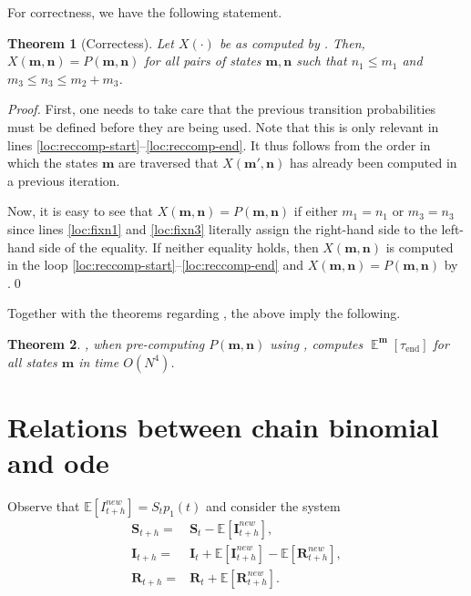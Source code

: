 \documentclass[a4paper,preprint]{elsarticle}
\newtheorem{theorem}{Theorem}
\newcommand{\htime}{\tau_\mathrm{end}}
\renewcommand{\vec}[1]{\boldsymbol{#1}}
\DeclareMathOperator{\Ex}{\mathbb{E}}
\begin{document}
For correctness, we have the following statement.
\begin{theorem}[Correctess]
    Let $X(\cdot)$ be as computed by . Then, $X(\vec{m}, \vec{n}) = P(\vec{m},\vec{n})$ for all pairs of states $\vec{m}, \vec{n}$ such that $n_1 \leq m_1$ and $m_3 \leq n_3 \leq m_2 + m_3$.
\end{theorem}
\begin{proof}
    First, one needs to take care that the previous transition probabilities must be defined before they are being used. Note that this is only relevant in lines \ref{loc:reccomp-start}--\ref{loc:reccomp-end}. It thus follows from the order in which the states $\vec{m}$ are traversed that $X(\vec{m'},\vec{n})$ has already been computed in a previous iteration.
    
    Now, it is easy to see that $X(\vec{m},\vec{n}) = P(\vec{m},\vec{n})$ if either $m_1 = n_1$ or $m_3 = n_3$ since lines \ref{loc:fixn1} and \ref{loc:fixn3} literally assign the right-hand side to the left-hand side of the equality. If neither equality holds, then $X(\vec{m},\vec{n})$ is computed in the loop \ref{loc:reccomp-start}--\ref{loc:reccomp-end} and $X(\vec{m},\vec{n}) = P(\vec{m},\vec{n})$ by .\qed
\end{proof}

Together with the theorems regarding , the above imply the following.
\begin{theorem}
    , when pre-computing $P(\vec{m},\vec{n})$ using , computes $\Ex^{\vec{m}}[\htime]$ for all states $\vec{m}$ in time $O(N^4)$.
\end{theorem}

\section{Relations between chain binomial and ode}

Observe that 
$\mathbb{E}[I_{t+h}^{new}]=S_t p_1(t)$ and consider the system
\begin{align}
\label{eq:difference_equations}
    \vec{S}_{t+h} = {} & \vec{S}_{t} - \mathbb{E}[\vec{I}_{t+h}^{new}], \\
    \vec{I}_{t+h} = {} & \vec{I}_{t} + \mathbb{E}[\vec{I}_{t+h}^{new}] - \mathbb{E}[\vec{R}_{t+h}^{new}], \\
    \vec{R}_{t+h} = {} & \vec{R}_{t} + \mathbb{E}[\vec{R}_{t+h}^{new}]. 
    \label{eq:difference_equationsnext}
\end{align}
\end{document}
